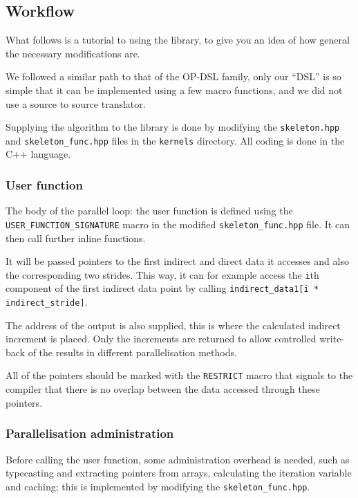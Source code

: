 \subsection{Workflow}

What follows is a tutorial to using the library, to give you an idea of how
general the necessary modifications are.

We followed a similar path to that of the OP-DSL family, only our ``DSL'' is so
simple that it can be implemented using a few macro functions, and we did not
use a source to source translator.

Supplying the algorithm to the library is done by modifying the
\lstinline{skeleton.hpp} and \lstinline{skeleton_func.hpp} files in the
\lstinline{kernels} directory. All coding is done in the C++ language.

\subsubsection{User function}

The body of the parallel loop: the user function is defined using the
\lstinline!USER_FUNCTION_SIGNATURE! macro in the modified
\lstinline{skeleton_func.hpp} file. It can then call further inline functions.

It will be passed pointers to the first indirect and direct data it accesses
and also the corresponding two strides. This way, it can for example access the
\lstinline{i}th component of the first indirect data point by calling
\lstinline!indirect_data1[i * indirect_stride]!.

The address of the output is also supplied, this is where the calculated
indirect increment is placed. Only the increments are returned to allow
controlled write-back of the results in different parallelisation methods.

All of the pointers should be marked with the \lstinline!RESTRICT! macro that
signals to the compiler that there is no overlap between the data accessed
through these pointers.

\subsubsection{Parallelisation administration}

Before calling the user function, some administration overhead is needed, such
as typecasting and extracting pointers from arrays, calculating the iteration
variable and caching; this is implemented by modifying the
\lstinline{skeleton_func.hpp}.

